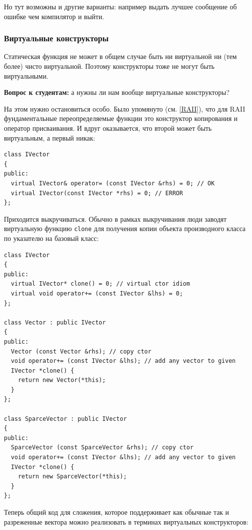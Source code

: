\documentclass[a4paper,12pt,oneside]{article}
\newif\ifanswers
\begin{document}
Но тут возможны и другие варианты: например выдать лучшее сообщение об ошибке чем компилятор и выйти.
\fi

\subsubsection{Виртуальные конструкторы}\label{VirtCtors}

Статическая функция не может в общем случае быть ни виртуальной ни (тем более) чисто виртуальной. Поэтому конструкторы тоже не могут быть виртуальными.

\textbf{Вопрос к студентам:} а нужны ли нам вообще виртуальные конструкторы?

\ifanswers
Правильный ответ: да очень нужны. Скажем виртуальный конструктор копирования позволил бы создать в явном виде объект производного класса по указателю на объект базового класса
\fi

На этом нужно остановиться особо. Было упомянуто (см. \ref{RAII}), что для RAII фундаментальные переопределяемые функции это конструктор копирования и оператор присваивания. И вдруг оказывается, что второй может быть виртуальным, а первый никак:

\begin{lstlisting}
class IVector
{
public:
  virtual IVector& operator= (const IVector &rhs) = 0; // OK
  virtual IVector(const IVector *rhs) = 0; // ERROR
};
\end{lstlisting}

Приходится выкручиваться. Обычно в рамках выкручивания люди заводят виртуальную функцию \lstinline!clone! для получения копии объекта производного класса по указателю на базовый класс:

\begin{lstlisting}
class IVector
{
public:
  virtual IVector* clone() = 0; // virtual ctor idiom
  virtual void operator+= (const IVector &lhs) = 0;
};

class Vector : public IVector
{
public: 
  Vector (const Vector &rhs); // copy ctor
  void operator+= (const IVector &lhs); // add any vector to given
  IVector *clone() {
    return new Vector(*this);
  }
};

class SparceVector : public IVector
{
public: 
  SparceVector (const SparceVector &rhs); // copy ctor
  void operator+= (const IVector &lhs); // add any vector to given
  IVector *clone() {
    return new SparceVector(*this);
  }
};
\end{lstlisting}

Теперь общий код для сложения, которое поддерживает как обычные так и разреженные вектора можно реализовать в терминах виртуальных конструкторов:
\end{document}
